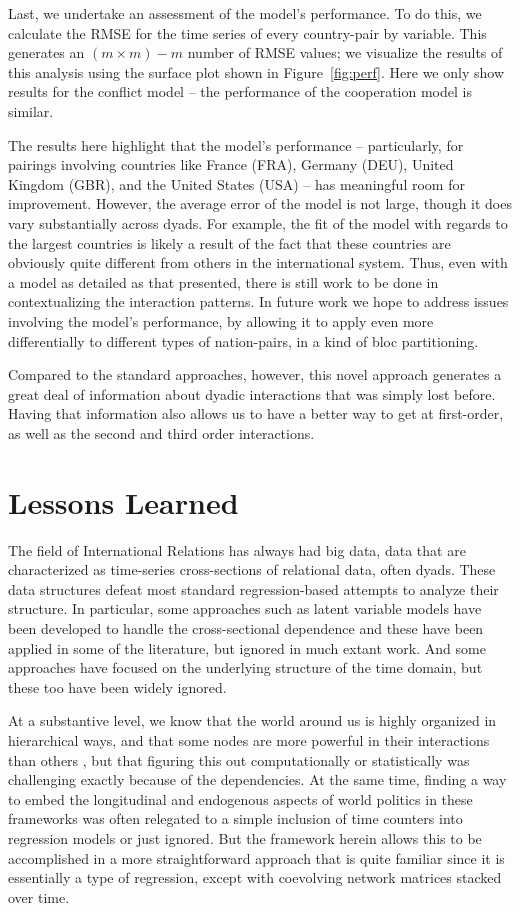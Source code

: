 \documentclass[3p,times,twocolumn,authoryear,12pt]{elsarticle}
\begin{document}
Last, we undertake an assessment of the model's performance. To do this, we calculate the RMSE for the time series of every country-pair by variable. This generates an $(m \times m) - m$ number of RMSE values; we visualize the results of this analysis using the surface plot shown in Figure~\ref{fig:perf}. Here we only show results for the conflict model -- the performance of the cooperation model is similar. 

The results here highlight that the model's performance -- particularly, for pairings involving countries like France (FRA), Germany (DEU), United Kingdom (GBR), and the United States (USA) -- has meaningful room for improvement.  However, the average error of the model is not large, though it does vary substantially across dyads.  For example, the  fit of the model with regards to the largest countries is likely a result of the fact that these countries are obviously quite different from others in the international system. Thus, even with a model as detailed as that presented, there is still work to be done in contextualizing the interaction patterns. In future work we hope to address issues involving the model's performance, by allowing it to apply even more differentially to different types of nation-pairs, in a kind of bloc partitioning. 

Compared to the standard approaches, however, this novel approach generates a great deal of information about dyadic interactions that was simply lost before. Having that information also allows us to have a better way to get at first-order, as well as the second and third order interactions.

\section{Lessons Learned}

The field of International Relations has always had big data, data that are characterized as time-series cross-sections of relational data, often dyads. These data structures defeat most standard regression-based attempts to analyze their structure. In particular, some approaches such as latent variable models have been developed to handle the cross-sectional dependence and these have been applied in some of the literature, but ignored in much extant work. And some approaches have focused on the underlying structure of the time domain, but these too have been widely ignored. 

At a substantive level, we know that the world around us is highly organized in hierarchical ways, and that some nodes are more powerful in their interactions than others \citep{house:ward:1988,house:ward:1988a}, but that figuring this out computationally or statistically was challenging exactly because of the dependencies. At the same time, finding a way to embed the longitudinal and endogenous aspects of world politics in these frameworks was often relegated to a simple inclusion of time counters into regression models or just ignored. But the framework herein allows this to be accomplished in a more straightforward approach that is quite familiar since it is essentially a type of regression, except with coevolving network matrices stacked over time.  
\end{document}
